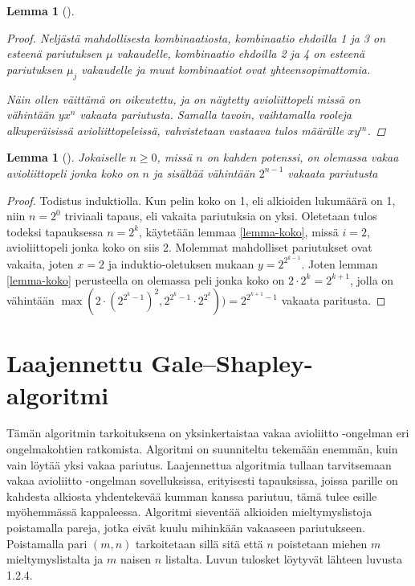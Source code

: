 \documentclass[finnish]{tktltiki2}
\newtheorem{lem}[lau]{Lemma}
\theoremstyle{definition}
\theoremstyle{remark}
\begin{document}
\begin{lem}[\cite{gusfield1989stable}]
\begin{proof}
Neljästä mahdollisesta kombinaatiosta, kombinaatio ehdoilla 1 ja 3 on esteenä pariutuksen $\mu$ vakaudelle, kombinaatio ehdoilla 2 ja 4 on esteenä pariutuksen $\mu_j$ vakaudelle ja muut kombinaatiot ovat yhteensopimattomia.

Näin ollen väittämä on oikeutettu, ja on näytetty avioliittopeli missä on vähintään $yx^n$ vakaata pariutusta. Samalla tavoin, vaihtamalla rooleja alkuperäisissä avioliittopeleissä, vahvistetaan vastaava tulos määrälle $xy^m$.
\end{proof}
\end{lem}

\begin{lem}[\cite{gusfield1989stable}]
Jokaiselle $n \geq 0$, missä $n$ on kahden potenssi, on olemassa vakaa avioliittopeli jonka koko on $n$ ja sisältää vähintään $2^{n-1}$ vakaata pariutusta
\end{lem}
\begin{proof}
Todistus induktiolla. Kun pelin koko on 1, eli alkioiden lukumäärä on 1, niin $n = 2^0$ triviaali tapaus, eli vakaita pariutuksia on yksi. Oletetaan tulos todeksi tapauksessa $n = 2^k$, käytetään lemmaa \ref{lemma-koko}, missä $i = 2$, avioliittopeli jonka koko on siis 2. Molemmat mahdolliset pariutukset ovat vakaita, joten $x = 2$ ja induktio-oletuksen mukaan $y = 2^{2^{k-1}}$. Joten lemman \ref{lemma-koko} perusteella on olemassa peli jonka koko on $2 \cdot 2^k = 2^{k+1}$, jolla on vähintään $\max(2 \cdot (2^{2^{{k}}-1})^2, 2^{2^{k}-1} \cdot 2^{2^{k}})) = 2^{2^{k+1}-1}$ vakaata paritusta.
\end{proof}

\section{Laajennettu Gale--Shapley-algoritmi}
Tämän algoritmin tarkoituksena on yksinkertaistaa vakaa avioliitto -ongelman eri ongelmakohtien ratkomista. Algoritmi on suunniteltu tekemään enemmän, kuin vain löytää yksi vakaa pariutus. Laajennettua algoritmia tullaan tarvitsemaan vakaa avioliitto -ongelman sovelluksissa, erityisesti tapauksissa, joissa parille on kahdesta alkiosta yhdentekevää kumman kanssa pariutuu, tämä tulee esille myöhemmässä kappaleessa. Algoritmi sieventää alkioiden mieltymyslistoja poistamalla pareja, jotka eivät kuulu mihinkään vakaaseen pariutukseen. Poistamalla pari $(m, n)$ tarkoitetaan sillä sitä että $n$ poistetaan miehen $m$ mieltymyslistalta ja $m$ naisen $n$ listalta. Luvun tulosket löytyvät lähteen \cite{gusfield1989stable} luvusta 1.2.4.
\end{document}
